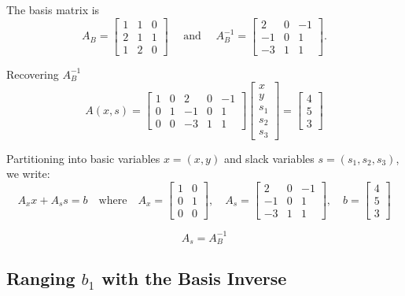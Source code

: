 The basis matrix is
$$
A_B = \begin{bmatrix}
1 & 1 & 0\\
2 & 1 & 1\\
1 & 2 & 0
\end{bmatrix}
\quad \text{ and } \quad
A_B^{-1} = \begin{bmatrix}
2 & 0 & -1\\
-1 & 0 & 1\\
-3 & 1 & 1
\end{bmatrix}.
$$

\begin{remark}{Recovering $A_B^{-1}$}{}
\[
A(x, s) =
\begin{bmatrix}
1 & 0 & 2 & 0 & -1 \\
0 & 1 & -1 & 0 & 1 \\
0 & 0 & -3 & 1 & 1
\end{bmatrix}
\begin{bmatrix}
x \\ y \\ s_1 \\ s_2 \\ s_3
\end{bmatrix}
=
\begin{bmatrix}
4 \\ 5 \\ 3
\end{bmatrix}
\]

Partitioning into basic variables \( x = (x, y) \) and slack variables \( s = (s_1, s_2, s_3) \), we write:
\[
A_x x + A_s s = b
\quad \text{where} \quad
A_x =
\begin{bmatrix}
1 & 0 \\
0 & 1 \\
0 & 0
\end{bmatrix}, \quad
A_s =
\begin{bmatrix}
2 & 0 & -1 \\
-1 & 0 & 1 \\
-3 & 1 & 1
\end{bmatrix}, \quad
b =
\begin{bmatrix}
4 \\ 5 \\ 3
\end{bmatrix}
\]

\[
A_s = A_B^{-1}
\]

\end{remark}

\subsection{Ranging \( b_1 \) with the Basis Inverse}

